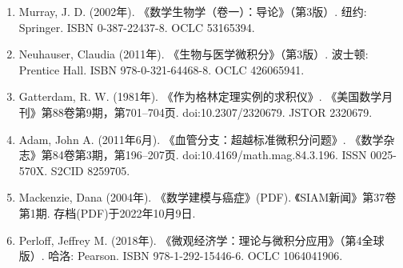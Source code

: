 \begin{enumerate}
\item Murray, J. D. (2002年). 《数学生物学（卷一）：导论》（第3版）. 纽约: Springer. ISBN 0-387-22437-8. OCLC 53165394.
\item Neuhauser, Claudia (2011年). 《生物与医学微积分》（第3版）. 波士顿: Prentice Hall. ISBN 978-0-321-64468-8. OCLC 426065941.
\item Gatterdam, R. W. (1981年). 《作为格林定理实例的求积仪》. 《美国数学月刊》第88卷第9期，第701–704页. doi:10.2307/2320679. JSTOR 2320679.
\item Adam, John A. (2011年6月). 《血管分支：超越标准微积分问题》. 《数学杂志》第84卷第3期，第196–207页. doi:10.4169/math.mag.84.3.196. ISSN 0025-570X. S2CID 8259705.
\item Mackenzie, Dana (2004年). 《数学建模与癌症》(PDF). 《SIAM新闻》第37卷第1期. 存档(PDF)于2022年10月9日.
\item Perloff, Jeffrey M. (2018年). 《微观经济学：理论与微积分应用》（第4全球版）. 哈洛: Pearson. ISBN 978-1-292-15446-6. OCLC 1064041906.
\end{enumerate}


